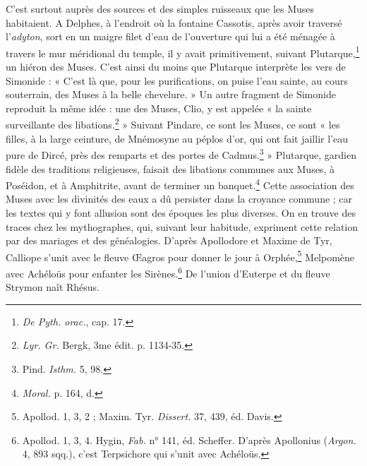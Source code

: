 \documentclass[a4paper, 11pt, oneside, polutonikogreek, french]{article}
\begin{document}
C'est surtout auprès des sources et des simples ruisseaux que les Muses habitaient. A Delphes, à l'endroit où la fontaine Cassotis, après avoir traversé l'\emph{adyton}, sort en un maigre filet d'eau de l'ouverture qui lui a été ménagée à travers le mur méridional du temple, il y avait primitivement, suivant Plutarque,\footnote{\emph{De Pyth. orac.}, cap. 17.} un hiéron des Muses. C'est ainsi du moins que Plutarque interprète les vers de Simonide : « C'est là que, pour les purifications, on puise l'eau sainte, au cours souterrain, des Muses à la belle chevelure. » Un autre fragment de Simonide reproduit la même idée : une des Muses, Clio, y est appelée « la sainte surveillante des libations.\footnote{\emph{Lyr. Gr.} Bergk, 3me édit. p. 1134-35.} » Suivant Pindare, ce sont les Muses, ce sont « les filles, à la large ceinture, de Mnémosyne au péplos d'or, qui ont fait jaillir l'eau pure de Dircé, près des remparts et des portes de Cadmus.\footnote{Pind. \emph{Isthm.} 5, 98.} » Plutarque, gardien fidèle des traditions religieuses, faisait des libations communes aux Muses, à Poséidon, et à Amphitrite, avant de terminer un banquet.\footnote{\emph{Moral.} p. 164, d.} Cette association des Muses avec les divinités des eaux a dû persister dans la croyance commune ; car les textes qui y font allusion sont des époques les plus diverses. On en trouve des traces chez les mythographes, qui, suivant leur habitude, expriment cette relation par des mariages et des généalogies. D'après Apollodore et Maxime de Tyr, Calliope s'unit avec le fleuve Œagros pour donner le jour à Orphée,\footnote{Apollod. 1, 3, 2 ; Maxim. Tyr. \emph{Dissert.} 37, 439, éd. Davis.} Melpomène avec Achéloüs pour enfanter les Sirènes.\footnote{Apollod. 1, 3, 4. Hygin, \emph{Fab.} n° 141, éd. Scheffer. D'après Apollonius (\emph{Argon.} 4, 893 sqq.), c'est Terpsichore qui s'unit avec Achéloüs.} De l'union d'Euterpe et du fleuve Strymon naît Rhésus.
\end{document}

